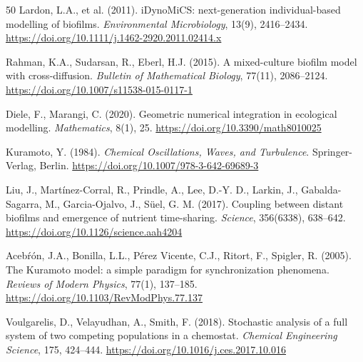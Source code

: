 \documentclass[11pt]{article}
\begin{document}
\begin{thebibliography}{50}
Lardon, L.A., et al. (2011).
iDynoMiCS: next-generation individual-based modelling of biofilms.
\textit{Environmental Microbiology}, 13(9), 2416--2434.
\url{https://doi.org/10.1111/j.1462-2920.2011.02414.x}

Rahman, K.A., Sudarsan, R., Eberl, H.J. (2015).
A mixed-culture biofilm model with cross-diffusion.
\textit{Bulletin of Mathematical Biology}, 77(11), 2086--2124.
\url{https://doi.org/10.1007/s11538-015-0117-1}

Diele, F., Marangi, C. (2020).
Geometric numerical integration in ecological modelling.
\textit{Mathematics}, 8(1), 25.
\url{https://doi.org/10.3390/math8010025}

Kuramoto, Y. (1984).
\textit{Chemical Oscillations, Waves, and Turbulence}.
Springer-Verlag, Berlin.
\url{https://doi.org/10.1007/978-3-642-69689-3}

Liu, J., Mart\'{i}nez-Corral, R., Prindle, A., Lee, D.-Y. D., Larkin, J.,
Gabalda-Sagarra, M., Garcia-Ojalvo, J., S\"{u}el, G. M. (2017).
Coupling between distant biofilms and emergence of nutrient time-sharing.
\textit{Science}, 356(6338), 638--642.
\url{https://doi.org/10.1126/science.aah4204}

Aceb\'r\'on, J.A., Bonilla, L.L., P\'erez Vicente, C.J., Ritort, F., Spigler, R. (2005).
The Kuramoto model: a simple paradigm for synchronization phenomena.
\textit{Reviews of Modern Physics}, 77(1), 137--185.
\url{https://doi.org/10.1103/RevModPhys.77.137}

Voulgarelis, D., Velayudhan, A., Smith, F. (2018).
Stochastic analysis of a full system of two competing populations in a chemostat.
\textit{Chemical Engineering Science}, 175, 424--444.
\url{https://doi.org/10.1016/j.ces.2017.10.016}


\end{thebibliography}
\end{document}
